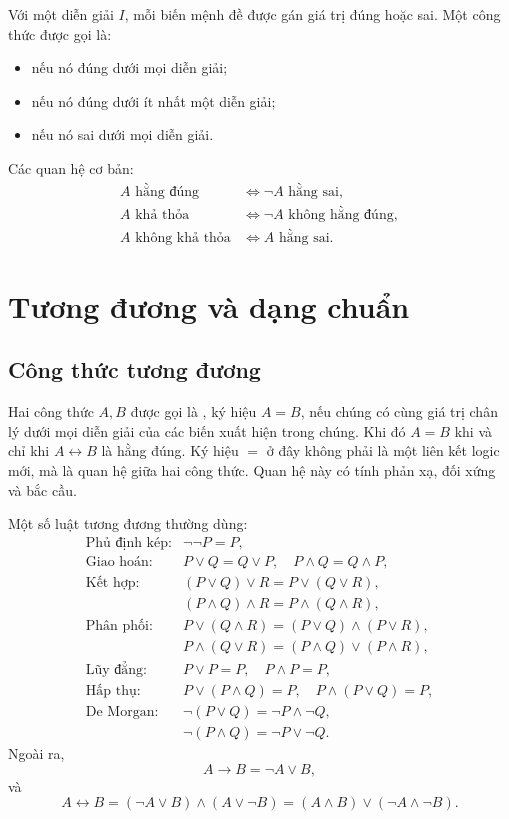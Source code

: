 \documentclass[11pt]{article}
\begin{document}
Với một diễn giải \(I\), mỗi biến mệnh đề được gán giá trị đúng hoặc sai.
Một công thức được gọi là:
\begin{itemize}
  \item {} nếu nó đúng dưới mọi diễn giải;
  \item {} nếu nó đúng dưới ít nhất một diễn giải;
  \item {} nếu nó sai dưới mọi diễn giải.
\end{itemize}

Các quan hệ cơ bản:
\[
\begin{aligned}
A\text{ hằng đúng} &\Longleftrightarrow \neg A\text{ hằng sai},\\
A\text{ khả thỏa} &\Longleftrightarrow \neg A\text{ không hằng đúng},\\
A\text{ không khả thỏa} &\Longleftrightarrow A\text{ hằng sai}.
\end{aligned}
\]

\section{Tương đương và dạng chuẩn}

\subsection{Công thức tương đương}

Hai công thức \(A,B\) được gọi là , ký hiệu \(A=B\), nếu
chúng có cùng giá trị chân lý dưới mọi diễn giải của các biến xuất hiện trong
chúng. Khi đó \(A=B\) khi và chỉ khi \(A\leftrightarrow B\) là hằng đúng.
Ký hiệu \(=\) ở đây không phải là một liên kết logic mới, mà là quan hệ giữa
hai công thức. Quan hệ này có tính phản xạ, đối xứng và bắc cầu.

Một số luật tương đương thường dùng:
\[
\begin{array}{ll}
\text{Phủ định kép:} & \neg\neg P=P,\\[0.2em]
\text{Giao hoán:} & P\lor Q=Q\lor P,\quad P\land Q=Q\land P,\\[0.2em]
\text{Kết hợp:} & (P\lor Q)\lor R=P\lor(Q\lor R),\\
& (P\land Q)\land R=P\land(Q\land R),\\[0.2em]
\text{Phân phối:} & P\lor(Q\land R)=(P\lor Q)\land(P\lor R),\\
& P\land(Q\lor R)=(P\land Q)\lor(P\land R),\\[0.2em]
\text{Lũy đẳng:} & P\lor P=P,\quad P\land P=P,\\[0.2em]
\text{Hấp thụ:} & P\lor(P\land Q)=P,\quad P\land(P\lor Q)=P,\\[0.2em]
\text{De Morgan:} & \neg(P\lor Q)=\neg P\land\neg Q,\\
& \neg(P\land Q)=\neg P\lor\neg Q.
\end{array}
\]
Ngoài ra,
\[
  A\to B=\neg A\lor B,
\]
và
\[
  A\leftrightarrow B=(\neg A\lor B)\land(A\lor\neg B)
  =(A\land B)\lor(\neg A\land\neg B).
\]
\end{document}
